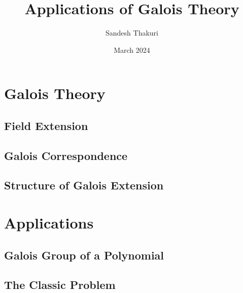 \documentclass[a4paper,12pt,oneside,onecolumn,openany,final]{memoir}
\title{Applications of Galois Theory}
\author{Sandesh Thakuri}
\date{March 2024}
\begin{document}
\frontmatter











\tableofcontents  %
\listoffigures*
\listoftables*

\mainmatter
\part{Galois Theory}

\chapter{Field Extension}


\chapter{Galois Correspondence}


\chapter{Structure of Galois Extension}


\part{Applications}

\chapter{Galois Group of a Polynomial}


\chapter{The Classic Problem}

\end{document}
